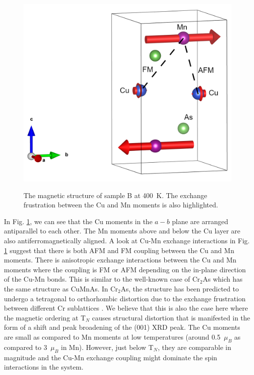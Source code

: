 \documentclass[10pt,doublespacing,edeposit]{uiucthesis2020}
\begin{document}
\begin{mainmatter}
\begin{figure}
\centering\includegraphics[width=0.9\columnwidth]{figures/ch7/mag43_Cu_moments_400K.png} \\
\caption{\label{fig:400K_mag_structure}
The magnetic structure of sample B at 400~K. The exchange frustration between the Cu and Mn moments is also highlighted.
} 
\end{figure}

In Fig. \ref{fig:400K_mag_structure}, we can see that the Cu moments in the $a-b$ plane are arranged antiparallel to each other. The Mn moments above and below the Cu layer are also antiferromagnetically aligned. A look at Cu-Mn exchange interactions in Fig. \ref{fig:400K_mag_structure} suggest that there is both AFM and FM coupling between the Cu and Mn moments. There is anisotropic exchange interactions between the Cu and Mn moments where the coupling is FM or AFM depending on the in-plane direction of the Cu-Mn bonds. This is similar to the well-known case of Cr$_2$As which has the same structure as CuMnAs. In Cr$_2$As, the structure has been predicted to undergo a tetragonal to orthorhombic distortion due to the exchange frustration between different Cr sublattices \cite{Zhang2013}. We believe that this is also the case here where the magnetic ordering at T$_N$ causes structural distortion that is manifested in the form of a shift and peak broadening of the (001) XRD peak. The Cu moments are small as compared to Mn moments at low temperatures (around 0.5~$\mu_B$ as compared to 3~$\mu_B$ in Mn). However, just below T$_N$, they are comparable in magnitude and the Cu-Mn exchange coupling might dominate the spin interactions in the system.


\end{mainmatter}
\end{document}
